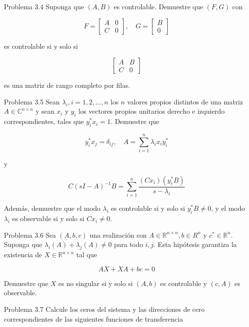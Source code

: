 \documentclass[11pt]{article}
\begin{document}
Problema 3.4 Suponga que $(A, B)$ es controlable. Demuestre que $(F, G)$ con

$$
F=\left[\begin{array}{ll}
A & 0 \\
C & 0
\end{array}\right], \quad G=\left[\begin{array}{l}
B \\
0
\end{array}\right]
$$

es controlable si y solo si

$$
\left[\begin{array}{ll}
A & B \\
C & 0
\end{array}\right]
$$

es una matriz de rango completo por filas.

Problema 3.5 Sean $\lambda_{i}, i=1,2, \ldots, n$ los $n$ valores propios distintos de una matriz $A \in \mathbb{C}^{n \times n}$ y sean $x_{i}$ y $y_{i}$ los vectores propios unitarios derecho e izquierdo correspondientes, tales que $y_{i}^{*} x_{i}=1$. Demuestre que

$$
y_{i}^{*} x_{j}=\delta_{i j}, \quad A=\sum_{i=1}^{n} \lambda_{i} x_{i} y_{i}^{*}
$$

y

$$
C(s I-A)^{-1} B=\sum_{i=1}^{n} \frac{\left(C x_{i}\right)\left(y_{i}^{*} B\right)}{s-\lambda_{i}}
$$

Además, demuestre que el modo $\lambda_{i}$ es controlable si y solo si $y_{i}^{*} B \neq 0$, y el modo $\lambda_{i}$ es observable si y solo si $C x_{i} \neq 0$.

Problema 3.6 Sea $(A, b, c)$ una realización con $A \in \mathbb{R}^{n \times n}, b \in R^{n}$ y $c^{*} \in \mathbb{R}^{n}$. Suponga que $\lambda_{i}(A)+\lambda_{j}(A) \neq 0$ para todo $i, j$. Esta hipótesis garantiza la existencia de $X \in \mathbb{R}^{n \times n}$ tal que

$$
A X+X A+b c=0
$$

Demuestre que $X$ es no singular si y solo si $(A, b)$ es controlable y $(c, A)$ es observable.

Problema 3.7 Calcule los ceros del sistema y las direcciones de cero correspondientes de las siguientes funciones de transferencia
\end{document}
